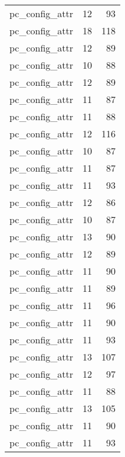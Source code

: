 \begin{table}
\begin{tabular}{lrr}
                  pc\_config\_attr &        12 &        93 \\
                  pc\_config\_attr &        18 &       118 \\
                  pc\_config\_attr &        12 &        89 \\
                  pc\_config\_attr &        10 &        88 \\
                  pc\_config\_attr &        12 &        89 \\
                  pc\_config\_attr &        11 &        87 \\
                  pc\_config\_attr &        11 &        88 \\
                  pc\_config\_attr &        12 &       116 \\
                  pc\_config\_attr &        10 &        87 \\
                  pc\_config\_attr &        11 &        87 \\
                  pc\_config\_attr &        11 &        93 \\
                  pc\_config\_attr &        12 &        86 \\
                  pc\_config\_attr &        10 &        87 \\
                  pc\_config\_attr &        13 &        90 \\
                  pc\_config\_attr &        12 &        89 \\
                  pc\_config\_attr &        11 &        90 \\
                  pc\_config\_attr &        11 &        89 \\
                  pc\_config\_attr &        11 &        96 \\
                  pc\_config\_attr &        11 &        90 \\
                  pc\_config\_attr &        11 &        93 \\
                  pc\_config\_attr &        13 &       107 \\
                  pc\_config\_attr &        12 &        97 \\
                  pc\_config\_attr &        11 &        88 \\
                  pc\_config\_attr &        13 &       105 \\
                  pc\_config\_attr &        11 &        90 \\
                  pc\_config\_attr &        11 &        93 \\

\end{tabular}
\end{table}
